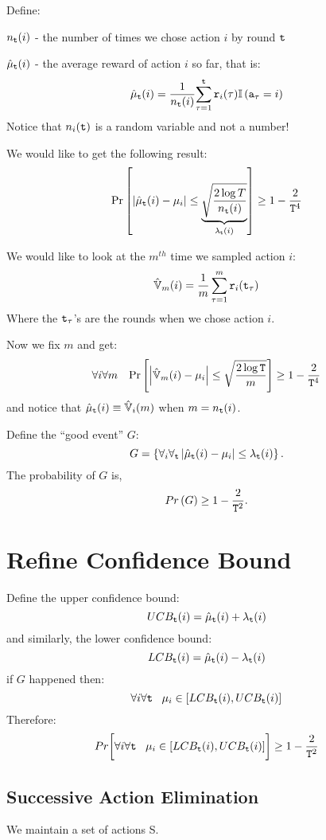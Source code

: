 Define:

$n_{{\tt t}}(i)$ - the number of times we chose action $i$ by round ${\tt t}$

$\hat{\mu}_{{\tt t}}(i)$ - the average reward of action $i$ so far, that
is:
\[
\hat{\mu}_{{\tt t}}(i)=\frac{1}{n_{{\tt t}}(i)}{\displaystyle
\sum_{\tau=1}^{{\tt t}}{\tt r}_{i}(\tau)}\mathbb{I}\left({\tt a}_{\tau}=i\right)
\]
Notice that $n_{i}({\tt t})$ is a random variable and not a number!

We would like to get the following result:
\[
\Pr\left[\left|\hat{\mu}_{{\tt t}}(i)-\mu_{i}\right|\le\underbrace{\sqrt{\frac{2\log
T}{n_{{\tt t}}(i)}}}_{\lambda_{{\tt t}}(i)}\right]\ge1-\frac{2}{{\tt T}^{4}}
\]

We would like to look at the $m^{th}$ time we sampled action $i$:
\[
\hat{\mathbb{V}}_{m}(i)=\frac{1}{m} \sum_{\tau=1}^{m}{\tt r}_{i}({\tt t}_{\tau})
\]
Where the ${\tt t}_{\tau}$'s are the rounds when we chose action $i$.

Now we fix $m$ and get:
\[
\forall{i}\forall{m}\;\;\;
\Pr\left[\left|\hat{\mathbb{V}}_{m}(i)-\mu_{i}\right|\le\sqrt{\frac{2\log
{\tt T}}{m}}\right]\ge1-\frac{2}{{\tt T}^{4}}
\]
and notice that $\hat{\mu}_{{\tt t}}(i)\equiv\hat{\mathbb{V}}_{i}(m)$ when
$m=n_{{\tt t}}(i)$.

Define the ``good event'' $G$:
\[
G=\left\{ \forall_{i}\forall_{{\tt t}}\left|\hat{\mu}_{{\tt t}}(i)-\mu_{i}\right|\le\lambda_{{\tt t}}(i)\right\}.
\]
The probability of $G$ is,
\[
Pr\left(G\right)\ge1-\frac{2}{{\tt T}^{2}}.
\]

\section{Refine Confidence Bound}

Define the upper confidence bound:
\[
UCB_{{\tt t}}(i)=\hat{\mu}_{{\tt t}}(i)+\lambda_{{\tt t}}(i)
\]
and similarly, the lower confidence bound:
\[
LCB_{{\tt t}}(i)=\hat{\mu}_{{\tt t}}(i)-\lambda_{{\tt t}}(i)
\]
if $G$ happened then:
\[
\forall{i}\forall{{\tt t}}\;\;\;\mu_{i}\in\left[LCB_{{\tt t}}(i),UCB_{{\tt t}}(i)\right]
\]
Therefore:
\[
Pr\biggl[\forall{i}\forall{{\tt t}}\;\;\;
\mu_{i}\in\left[LCB_{{\tt t}}(i),UCB_{{\tt t}}(i)\right]\biggr]\ge1-\frac{2}{{\tt T}^{2}}
\]

\subsection{Successive Action Elimination}

We maintain a set of actions S.

